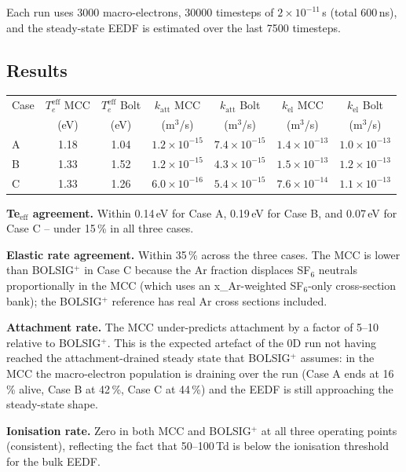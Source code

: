 \documentclass[11pt,a4paper]{article}
\newcommand{\katt}{k_{\mathrm{att}}}
\begin{document}
Each run uses 3000 macro-electrons, 30000 timesteps of
$2\times 10^{-11}\,$s (total 600\,ns), and the steady-state
EEDF is estimated over the last 7500 timesteps.

\subsection{Results}

\begin{center}
\begin{tabular}{lcccccc}
\toprule
Case & $T_e^{\mathrm{eff}}$ MCC & $T_e^{\mathrm{eff}}$ Bolt
     & $\katt$ MCC & $\katt$ Bolt & $k_{\mathrm{el}}$ MCC
     & $k_{\mathrm{el}}$ Bolt \\
     & (eV) & (eV)
     & (m$^3$/s) & (m$^3$/s) & (m$^3$/s) & (m$^3$/s) \\
\midrule
A & 1.18 & 1.04 & $1.2\!\times\!10^{-15}$ & $7.4\!\times\!10^{-15}$
  & $1.4\!\times\!10^{-13}$ & $1.0\!\times\!10^{-13}$ \\
B & 1.33 & 1.52 & $1.2\!\times\!10^{-15}$ & $4.3\!\times\!10^{-15}$
  & $1.5\!\times\!10^{-13}$ & $1.2\!\times\!10^{-13}$ \\
C & 1.33 & 1.26 & $6.0\!\times\!10^{-16}$ & $5.4\!\times\!10^{-15}$
  & $7.6\!\times\!10^{-14}$ & $1.1\!\times\!10^{-13}$ \\
\bottomrule
\end{tabular}
\end{center}

\textbf{Te$_{\mathrm{eff}}$ agreement.} Within 0.14\,eV for
Case A, 0.19\,eV for Case B, and 0.07\,eV for Case C --
under 15\,\% in all three cases.

\textbf{Elastic rate agreement.} Within 35\,\% across the three
cases. The MCC is lower than BOLSIG$^+$ in Case C because
the Ar fraction displaces SF$_6$ neutrals proportionally in
the MCC (which uses an x\_Ar-weighted SF$_6$-only cross-section
bank); the BOLSIG$^+$ reference has real Ar cross sections
included.

\textbf{Attachment rate.} The MCC under-predicts attachment by
a factor of 5--10 relative to BOLSIG$^+$. This is the expected
artefact of the 0D run not having reached the attachment-drained
steady state that BOLSIG$^+$ assumes: in the MCC the
macro-electron population is draining over the run (Case A ends
at 16\,\% alive, Case B at 42\,\%, Case C at 44\,\%) and the
EEDF is still approaching the steady-state shape.

\textbf{Ionisation rate.} Zero in both MCC and BOLSIG$^+$ at
all three operating points (consistent), reflecting the fact
that 50--100\,Td is below the ionisation threshold for the
bulk EEDF.
\end{document}

